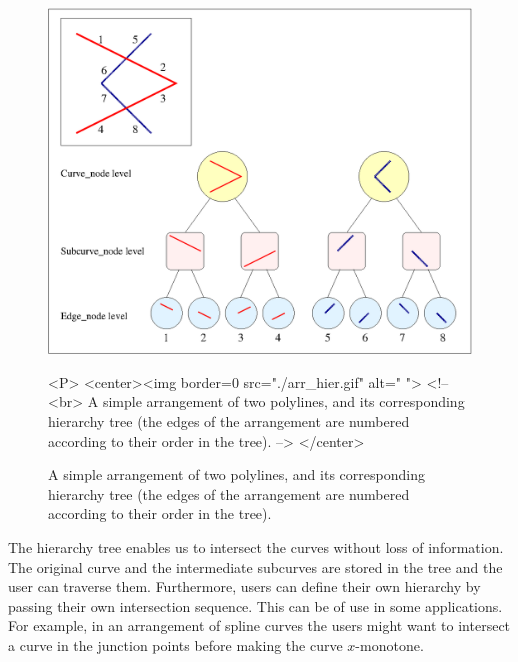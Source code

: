 \begin{figure}
\begin{ccTexOnly}
{\centerline {\includegraphics{Arrangement_2/arr_hier.ps}}}
\end{ccTexOnly}
\caption{A simple arrangement of two polylines, and its corresponding
hierarchy tree (the edges of the arrangement are numbered according to
their order in the tree).\label{fig:hierarchy}}
\begin{ccHtmlOnly}
<P>
<center><img border=0 src="./arr_hier.gif" alt=" ">
<!--
<br>
A simple arrangement of two polylines, and its corresponding hierarchy tree
(the edges of the arrangement are numbered according to their order
in the tree).
-->
</center>
\end{ccHtmlOnly}
\end{figure}

The hierarchy tree enables us to intersect the curves without loss of
information. The original curve and the intermediate subcurves are stored
in the tree and the user can traverse them. Furthermore, users can
define their own hierarchy by passing their own intersection sequence.
This can be of use in some applications. For example, in an arrangement
of spline curves the users might want to intersect a curve in the
junction points before making the curve $x$-monotone. 


